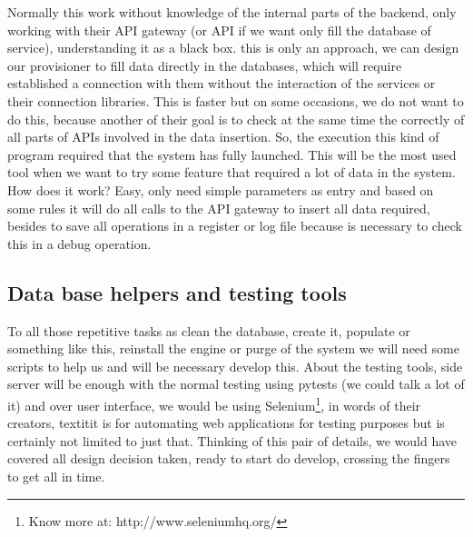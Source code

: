 \noindent Normally this work without knowledge
of the internal parts of the backend, only working with their API gateway (or
API if we want only fill the database of service), understanding it as a black box.
this is only an approach, we can design our provisioner to fill data directly
in the databases, which will require established a connection with them without
the interaction of the services or their connection libraries. This is faster but
on some occasions, we do not want to do this, because another of their goal is to
check at the same time the correctly of all parts of APIs involved in the data insertion.
\intro
So, the execution this kind of program required that the system has fully launched.
This will be the most used tool when we want to try some feature that required a
lot of data in the system.
\intro
How does it work? Easy, only need simple parameters as entry and based on some rules it will do all
calls to the API gateway to insert all data required, besides to save all operations
in a register or log file because is necessary to check this in a debug operation.

\subsection{Data base helpers and testing tools}

To all those repetitive tasks as clean the database, create it, populate or
something like this, reinstall the engine or purge of the system we will need
some scripts to help us and will be necessary develop this.
\intro
About the testing tools, side server will be enough with the normal testing using
pytests (we could talk a lot of it) and over user interface, we would be using
Selenium\footnote{Know more at: http://www.seleniumhq.org/},
in words of their creators, textit{it is for automating web applications for
testing purposes but is certainly not limited to just that}.
\intro
Thinking of this pair of details, we would have covered all design decision taken,
ready to start do develop, crossing the fingers to get all in time.
